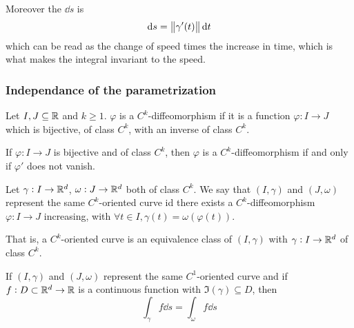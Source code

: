 \documentclass[12pt]{extarticle}
\begin{document}
Moreover the $\dd{s}$ is
\begin{equation}
    \dd{s} = \norm{\gamma'(t)} \dd{t}
\end{equation}
which can be read as the change of speed times the increase in time, which is what makes the integral invariant to the speed.

\subsubsection{Independance of the parametrization}

\begin{definition}[diffeomorphism]
    Let $I, J \subseteq \mathbb{R}$ and $k \geq 1$.
    $\varphi$ is a $C^k$-diffeomorphism if it is a function $\varphi: I \to J$ which is bijective, of class $C^k$, with an inverse of class $C^k$.
\end{definition}

\begin{proposition}
    If $\varphi: I \to J$ is bijective and of class $C^k$, then $\varphi$ is a $C^k$-diffeomorphism if and only if $\varphi'$ does not vanish.
\end{proposition}

\begin{definition}
    Let $\gamma: I \to \mathbb{R}^d$, $\omega: J \to \mathbb{R}^d$ both of class $C^k$.
    We say that $(I, \gamma)$ and $(J, \omega)$ represent the same $C^k$-oriented curve id there exists a $C^k$-diffeomorphism $\varphi: I \to J$ increasing, with $\forall t \in I, \gamma(t) = \omega(\varphi(t))$.

    That is, a $C^k$-oriented curve is an equivalence class of $(I, \gamma)$ with $\gamma: I \to \mathbb{R}^d$ of class $C^k$.
\end{definition}

\begin{proposition}
    \label{prop:path_int:scalar_indep_speed}
    If $(I, \gamma)$ and $(J, \omega)$ represent the same $C^1$-oriented curve and if $f: D \subset \mathbb{R}^d \to \mathbb{R}$  is a continuous function with $\Im(\gamma) \subseteq D$, then
    \begin{equation}
        \int_\gamma f \dd{s} = \int_\omega f \dd{s}
    \end{equation}
\end{proposition}
\end{document}

